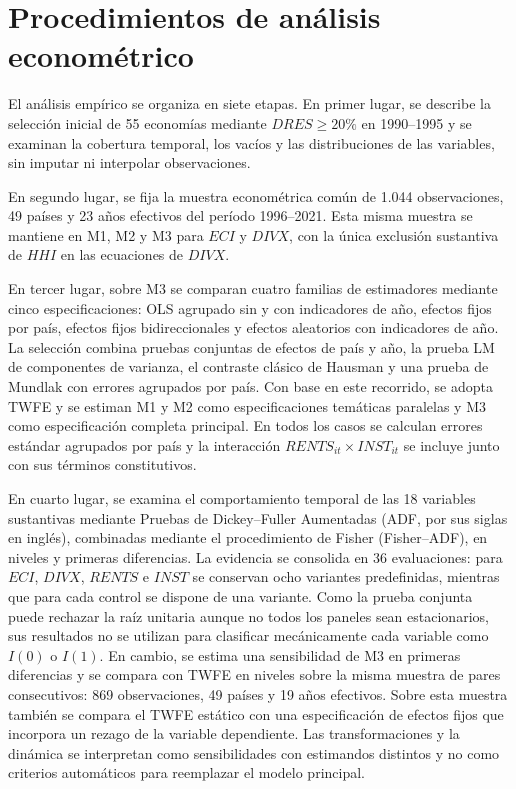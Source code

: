 \documentclass[../../TFM.tex]{subfiles}
\begin{document}
	\section{Procedimientos de análisis econométrico}
	\label{sec:analisis-econometrico}

	El análisis empírico se organiza en siete etapas. En primer lugar, se describe
	la selección inicial de 55 economías mediante $DRES\geq20\%$ en 1990--1995 y
	se examinan la cobertura temporal, los vacíos y las distribuciones de las
	variables, sin imputar ni interpolar observaciones.

	En segundo lugar, se fija la muestra econométrica común de 1.044 observaciones,
	49 países y 23 años efectivos del período 1996--2021. Esta misma muestra se
	mantiene en M1, M2 y M3 para $ECI$ y $DIVX$, con la única exclusión sustantiva
	de $HHI$ en las ecuaciones de $DIVX$.

	En tercer lugar, sobre M3 se comparan cuatro familias de estimadores mediante
	cinco especificaciones: OLS agrupado sin y con indicadores de año, efectos
	fijos por país, efectos fijos bidireccionales y efectos aleatorios con
	indicadores de año. La selección combina pruebas conjuntas de efectos de
	país y año, la prueba LM de componentes de varianza, el contraste clásico de
	Hausman y una prueba de Mundlak con errores agrupados por país. Con base en
	este recorrido, se adopta TWFE y se estiman M1 y M2 como especificaciones
	temáticas paralelas y M3 como especificación completa principal. En todos los
	casos se calculan errores estándar agrupados por país y la interacción
	$RENTS_{it}\times INST_{it}$ se incluye junto con sus términos constitutivos.

	En cuarto lugar, se examina el comportamiento temporal de las 18 variables
	sustantivas mediante Pruebas de Dickey--Fuller Aumentadas (ADF, por sus
	siglas en inglés), combinadas mediante el procedimiento de Fisher
	(Fisher--ADF), en niveles y primeras diferencias. La
	evidencia se consolida en 36 evaluaciones: para $ECI$, $DIVX$, $RENTS$ e
	$INST$ se conservan ocho variantes predefinidas, mientras que para cada control
	se dispone de una variante. Como la prueba conjunta puede rechazar la raíz
	unitaria aunque no todos los paneles sean estacionarios, sus resultados no se
	utilizan para clasificar mecánicamente cada variable como $I(0)$ o $I(1)$. En
	cambio, se estima una sensibilidad de M3 en primeras diferencias y se compara
	con TWFE en niveles sobre la misma muestra de pares consecutivos: 869
	observaciones, 49 países y 19 años efectivos. Sobre esta muestra también se
	compara el TWFE estático con una especificación de efectos fijos que incorpora
	un rezago de la variable dependiente. Las transformaciones y la dinámica se
	interpretan como sensibilidades con estimandos distintos y no como criterios
	automáticos para reemplazar el modelo principal.
\end{document}
